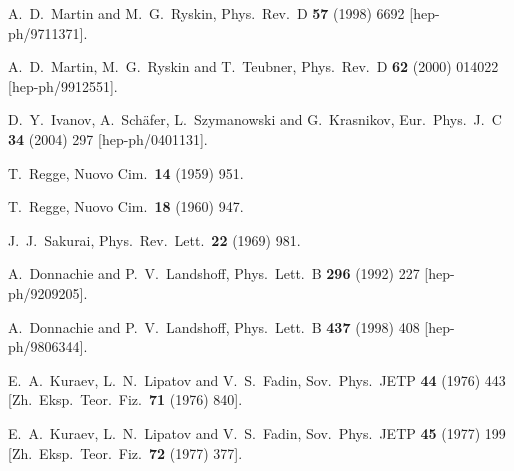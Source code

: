 \begin{thebibliography}{999}
A.~D.~Martin and M.~G.~Ryskin,
Phys.\ Rev.\ D {\bf 57} (1998) 6692 
[hep-ph/9711371].

A.~D.~Martin, M.~G.~Ryskin and T.~Teubner,
Phys.\ Rev.\ D {\bf 62} (2000) 014022 
[hep-ph/9912551].

D.~Y.~Ivanov, A.~Sch\"afer, L.~Szymanowski and G.~Krasnikov,
Eur.\ Phys.\ J.\ C {\bf 34} (2004) 297 
[hep-ph/0401131].



T.~Regge,
Nuovo Cim.\  {\bf 14} (1959) 951.  

T.~Regge,
Nuovo Cim.\  {\bf 18} (1960) 947.

J.~J.~Sakurai,
Phys.\ Rev.\ Lett.\  {\bf 22} (1969) 981.

A.~Donnachie and P.~V.~Landshoff,
Phys.\ Lett.\ B {\bf 296} (1992) 227 
[hep-ph/9209205].

A.~Donnachie and P.~V.~Landshoff,
Phys.\ Lett.\ B {\bf 437} (1998) 408 
[hep-ph/9806344].

E.~A.~Kuraev, L.~N.~Lipatov and V.~S.~Fadin,
Sov.\ Phys.\ JETP {\bf 44} (1976) 443
[Zh.\ Eksp.\ Teor.\ Fiz.\  {\bf 71} (1976) 840].

E.~A.~Kuraev, L.~N.~Lipatov and V.~S.~Fadin,
Sov.\ Phys.\ JETP {\bf 45} (1977) 199
[Zh.\ Eksp.\ Teor.\ Fiz.\  {\bf 72} (1977) 377].


\end{thebibliography}

